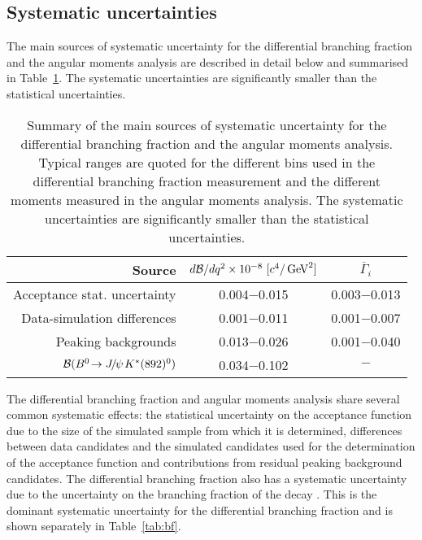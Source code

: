 \subsection{Systematic uncertainties}
\label{sec:kpimm:systematics}

The main sources of systematic uncertainty for the differential branching fraction and the angular moments analysis are described in detail below and summarised in Table~\ref{tab:systematics}. The systematic uncertainties are significantly smaller than the statistical uncertainties.

\begin{table}[!tb]
\caption{Summary of the main sources of systematic uncertainty for the differential branching fraction and the angular moments analysis. Typical ranges are quoted for the different \qsq bins used in the differential branching fraction measurement and the different moments measured in the angular moments analysis.  The systematic uncertainties are significantly smaller than the statistical uncertainties.}
\label{tab:systematics}
\begin{center}
\begin{tabular}{r|cc}
Source & $d{\mathcal{B}}/d{q^2} \times 10^{-8}~[c^{4}/\mathrm{\,Ge\kern -0.1em V}^{2}]$ & $\overline{\Gamma}_{i}$ \\
\hline
Acceptance stat. uncertainty & 0.004$-$0.015 & 0.003$-$0.013 \\
Data-simulation differences & 0.001$-$0.011 & 0.001$-$0.007 \\
Peaking backgrounds & 0.013$-$0.026 & 0.001$-$0.040 \\
\hline
${\mathcal{B}}({{B}^0}\!\rightarrow {\ensuremath{{J\mskip -3mu/\mskip -2mu\psi\mskip 2mu}}}{\ensuremath{K}}^{*}(892)^{0})$ & 0.034$-$0.102 & $-$ \\
\end{tabular}
\end{center}
\end{table} 

The differential branching fraction and angular moments analysis share several common systematic effects: the statistical uncertainty on the acceptance function due to the size of the simulated sample from which it is determined, differences between data candidates and the simulated candidates used for the determination of the acceptance function and contributions from residual peaking background candidates.  The differential branching fraction also has a systematic uncertainty due to the uncertainty on the branching fraction of the decay \BdToJPsiKstP. This is the dominant systematic uncertainty for the differential branching fraction and is shown separately in Table~\ref{tab:bf}. 

